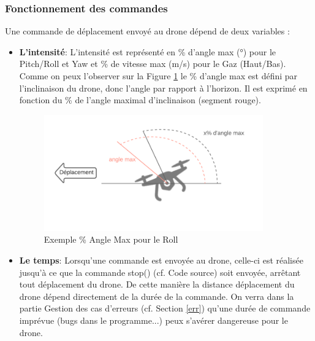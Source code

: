 \documentclass[12pt]{article}
\begin{document}
\subsubsection{Fonctionnement des commandes}
Une commande de déplacement envoyé au drone dépend de deux variables :
\begin{itemize}
    \item \textbf{L'intensité}: L'intensité est représenté en \% d'angle max (°) pour le Pitch/Roll et Yaw et \% de vitesse max (m/s) pour le Gaz (Haut/Bas). Comme on peux l'observer sur la Figure \ref{fig:prcangle} le \% d'angle max est défini par l'inclinaison du drone, donc l'angle par rapport à l'horizon. Il est exprimé en fonction du \% de l'angle maximal d'inclinaison (segment rouge).
    \begin{figure}[H]
    \centering
    \includegraphics[height=5cm]{PrcAngle.png}
    \caption{Exemple \% Angle Max pour le Roll}
    \label{fig:prcangle}
    \end{figure}
    \item \textbf{Le temps}: Lorsqu'une commande est envoyée au drone, celle-ci est réalisée jusqu'à ce que la commande stop() (cf. Code source\cite{git}) soit envoyée, arrêtant tout déplacement du drone. De cette manière la distance déplacement du drone dépend directement de la durée de la commande. On verra dans la partie Gestion des cas d'erreurs (cf. Section \ref{err}) qu'une durée de commande imprévue (bugs dans le programme...) peux s'avérer dangereuse pour le drone. 
\end{itemize}
\end{document}
